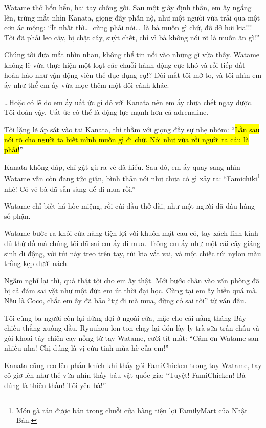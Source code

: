 \documentclass[../main.tex]{subfiles}
\begin{document}
Watame thở hổn hển, hai tay chống gối. Sau một giây định thần, em ấy ngẩng lên, trừng mắt nhìn Kanata, giọng đầy phẫn nộ, như một người vừa trải qua một cơn ác mộng: ``Ít nhất thì\dots\ cũng phải nói\dots\ là bà muốn gì chứ, đồ dở hơi kia!!! Tôi đã phải leo cây, bị chặt cây, suýt chết, chỉ vì bà không nói rõ là muốn ăn gì!''

Chúng tôi đưa mắt nhìn nhau, không thể tin nổi vào những gì vừa thấy. Watame không lẽ vừa thực hiện một loạt các chuỗi hành động cực khó và rồi tiếp đất hoàn hảo như vận động viên thể dục dụng cụ!? Đôi mắt tôi mở to, và tôi nhìn em ấy như thể em ấy vừa mọc thêm một đôi cánh khác.

\dots Hoặc có lẽ do em ấy uất ức gì đó với Kanata nên em ấy chưa chết ngay được. Tôi đoán vậy. Uất ức có thể là động lực mạnh hơn cả adrenaline.

Tôi lặng lẽ áp sát vào tai Kanata, thì thầm với giọng đầy sự nhẹ nhõm: ``\hl{Lần sau nói rõ cho người ta biết mình muốn gì đi chứ. Nói như vừa rồi người ta cáu là phải!}''

Kanata không đáp, chỉ gật gù ra vẻ đã hiểu. Sau đó, em ấy quay sang nhìn Watame vẫn còn đang tức giận, bình thản nói như chưa có gì xảy ra: ``Famichiki\footnote{Món gà rán được bán trong chuỗi cửa hàng tiện lợi FamilyMart của Nhật Bản.} nhé! Có vẻ bà đã sẵn sàng để đi mua rồi.''

Watame chỉ biết há hốc miệng, rồi cúi đầu thở dài, như một người đã đầu hàng số phận.

\ct

Watame bước ra khỏi cửa hàng tiện lợi với khuôn mặt cau có, tay xách lỉnh kỉnh đủ thứ đồ mà chúng tôi đã sai em ấy đi mua. Trông em ấy như một cái cây giáng sinh di động, với túi này treo trên tay, túi kia vắt vai, và một chiếc túi nylon màu trắng kẹp dưới nách.


Ngẫm nghĩ lại thì, quả thật tội cho em ấy thật. Mới bước chân vào văn phòng đã bị cả đám sai vặt như một đứa em út thời đại học. Cũng tại em ấy hiền quá mà. Nếu là Coco, chắc em ấy đã bảo ``tự đi mà mua, đừng có sai tôi'' từ ván đầu.

Tôi cùng ba người còn lại đứng đợi ở ngoài cửa, mặc cho cái nắng tháng Bảy chiếu thẳng xuống đầu. Ryuuhou lon ton chạy lại đón lấy ly trà sữa trân châu và gói khoai tây chiên cay nồng từ tay Watame, cười tít mắt: ``Cảm ơn Watame-san nhiều nha! Chị đúng là vị cứu tinh mùa hè của em!''

Kanata cũng reo lên phấn khích khi thấy gói FamiChicken trong tay Watame, tay cô giơ lên như thể vừa nhìn thấy báu vật quốc gia: ``Tuyệt! FamiChicken! Bà đúng là thiên thần! Tôi yêu bà!''
\end{document}
